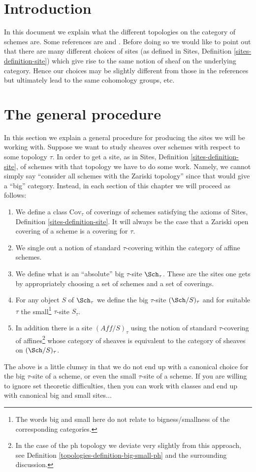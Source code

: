 \section{Introduction}
\label{topologies-section-introduction}
In this document we explain what the different topologies on the
category of schemes are. Some references are \cite{SGA1} and \cite{Ner}.
Before doing so we would like to point out that there are many
different choices of sites (as defined in
Sites, Definition \ref{sites-definition-site}) which give rise to
the same notion of sheaf on the underlying category. Hence
our choices may be slightly different from those in the references
but ultimately lead to the same cohomology groups, etc.

\section{The general procedure}
\label{topologies-section-procedure}
In this section we explain a general procedure for producing the
sites we will be working with. Suppose we want to study sheaves
over schemes with respect to some topology $\tau$. In order to
get a site, as in Sites, Definition \ref{sites-definition-site},
of schemes with that topology we have to do some work. Namely,
we cannot simply say ``consider all schemes with the Zariski topology''
since that would give a ``big'' category. Instead, in each section of
this chapter we will proceed as follows:
\begin{enumerate}
\item We define a class $\text{Cov}_\tau$ of coverings of schemes
satisfying the axioms of Sites, Definition \ref{sites-definition-site}.
It will always be the case that a Zariski open covering of
a scheme is a covering for $\tau$.
\item We single out a notion of standard
$\tau$-covering within the category of affine schemes.
\item We define what is an ``absolute'' big $\tau$-site $\Sch_\tau$.
These are the sites one gets by appropriately choosing a set of schemes
and a set of coverings.
\item For any object $S$ of $\Sch_\tau$
we define the big $\tau$-site $(\Sch/S)_\tau$ and for suitable
$\tau$ the small\footnote{The words big and
small here do not relate to bigness/smallness of the corresponding
categories.} $\tau$-site $S_\tau$.
\item In addition there is a site $(\textit{Aff}/S)_\tau$ using the
notion of standard $\tau$-covering of affines\footnote{In the case
of the ph topology we deviate very slightly from this approach, see
Definition \ref{topologies-definition-big-small-ph} and the surrounding discussion.}
whose category of sheaves
is equivalent to the category of sheaves on $(\Sch/S)_\tau$.
\end{enumerate}
The above is a little clumsy in that we do not end up with a canonical
choice for the big $\tau$-site of a scheme, or even the small
$\tau$-site of a scheme. If you are willing to ignore set theoretic
difficulties, then you can work with classes and end up with
canonical big and small sites...

